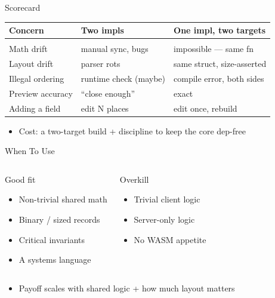 \begin{frame}{Scorecard}
  \begin{center}
  \footnotesize
  \begin{tabular}{@{}lll@{}}
    \textbf{Concern} & \textbf{Two impls} & \textbf{One impl, two targets} \\[2pt]
    \hline \\[-6pt]
    Math drift        & manual sync, bugs      & impossible --- same fn \\
    Layout drift      & parser rots            & same struct, size-asserted \\
    Illegal ordering  & runtime check (maybe)  & compile error, both sides \\
    Preview accuracy  & ``close enough''       & exact \\
    Adding a field    & edit N places          & edit once, rebuild \\
  \end{tabular}
  \end{center}
  \vspace{0.2cm}
  \pause
  \begin{itemize}
    \item Cost: a two-target build + discipline to keep the core dep-free
  \end{itemize}
\end{frame}

\begin{frame}{When To Use}
  \begin{columns}
      \begin{block}{Good fit}
        \begin{itemize}
          \item Non-trivial shared math
          \item Binary / sized records
          \item Critical invariants
          \item A systems language
        \end{itemize}
      \end{block}
      \begin{alertblock}{Overkill}
        \begin{itemize}
          \item Trivial client logic
          \item Server-only logic
          \item No WASM appetite
        \end{itemize}
      \end{alertblock}
  \end{columns}
  \vspace{0.3cm}
  \pause
  \begin{itemize}
    \item Payoff scales with shared logic + how much layout matters
  \end{itemize}
\end{frame}

